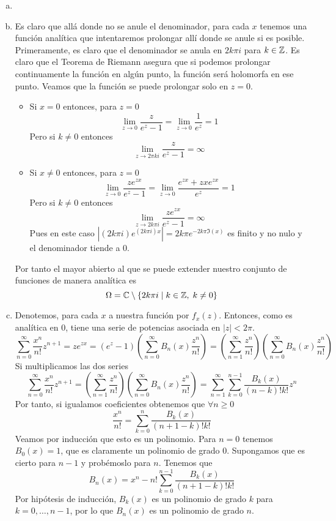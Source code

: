 \documentclass[twoside]{article}
\begin{document}
\begin{solucion}
\begin{enumerate}[(a)]
\item[]
\item Es claro que allá donde no se anule el denominador, para cada $x$ tenemos una función analítica que intentaremos prolongar allí donde se anule si es posible. Primeramente, es claro que el denominador se anula en $2k\pi i$ para $k\in \mathbb{Z}$. Es claro que el Teorema de Riemann asegura que si podemos prolongar continuamente la función en algún punto, la función será holomorfa en ese punto. Veamos que la función se puede prolongar solo en $z=0$.
\begin{itemize}
\item Si $x=0$ entonces, para $z=0$
$$
\lim_{z\to 0}\frac{z}{e^z-1} = \lim_{z\to 0}\frac{1}{e^z} = 1
$$
Pero si $k\neq 0$ entonces
$$
\lim_{z\to 2\pi k i}\frac{z}{e^z-1} = \infty
$$
\item Si $x\neq 0$ entonces, para $z=0$
$$
\lim_{z\to 0}\frac{ze^{zx}}{e^z-1} = \lim_{z\to 0}\frac{e^{zx}+zxe^{zx}}{e^z} = 1
$$
Pero si $k\neq 0$ entonces
$$
\lim_{z\to 2k\pi i}\frac{ze^{zx}}{e^z-1} = \infty
$$
Pues en este caso $|(2k\pi i)e^{(2k\pi i)x}| = 2k\pi e^{-2k\pi \Im(x)}$ es finito y no nulo y el denominador tiende a $0$.
\end{itemize}
Por tanto el mayor abierto al que se puede extender nuestro conjunto de funciones de manera analítica es
$$
\Omega = \mathbb{C}\setminus\{2k\pi i \mid k\in \mathbb{Z},\; k\neq 0\}
$$
\item Denotemos, para cada $x$ a nuestra función por $f_x(z)$. Entonces, como es analítica en $0$, tiene una serie de potencias asociada en $|z|<2\pi$. 
\[ \sum_{n=0}^\infty \frac{x^n}{n!}z^{n+1}= z e^{zx} =(e^z-1) \left(\sum_{n=0}^\infty B_n(x) \frac{z^n}{n!}\right)=\left( \sum_{n=1}^\infty \frac{z^n}{n!}\right)\left(\sum_{n=0}^\infty B_n(x) \frac{z^n}{n!}\right)\]
Si multiplicamos las dos series
\[ \sum_{n=0}^\infty \frac{x^n}{n!}z^{n+1}= \left( \sum_{n=1}^\infty \frac{z^n}{n!}\right)\left(\sum_{n=0}^\infty B_n(x) \frac{z^n}{n!}\right) = \sum_{n=1}^\infty\sum_{k=0}^{n-1}\frac{B_k(x)}{(n-k)!k!} z^n \]
Por tanto, si igualamos coeficientes obtenemos que $\forall n\geq 0$
$$
\frac{x^{n}}{n!} = \sum_{k=0}^{n} \frac{B_k(x)}{(n+1-k)!k!}
$$
Veamos por inducción que esto es un polinomio. Para $n=0$ tenemos $B_0(x) = 1$, que es claramente un polinomio de grado $0$. Supongamos que es cierto para $n-1$ y probémoslo para $n$. Tenemos que
$$
B_n(x) = x^n - n!\sum_{k=0}^{n-1} \frac{B_k(x)}{(n+1-k)!k!}
$$
Por hipótesis de inducción, $B_k(x)$ es un polinomio de grado $k$ para $k=0,\dotsc,n-1$, por lo que $B_n(x)$ es un polinomio de grado $n$.

\end{enumerate}
\end{solucion}
\end{document}

